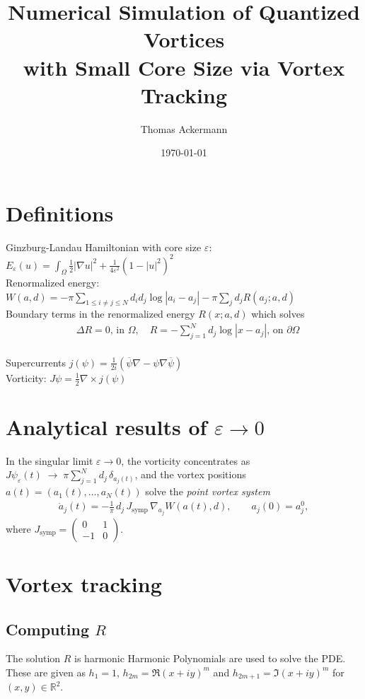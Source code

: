 \documentclass[12pt, a4paper]{article}
\title{
  \textbf{Numerical Simulation of Quantized Vortices\\
  with Small Core Size via Vortex Tracking}\\
}
\author{Thomas Ackermann}
\date{\today}
\theoremstyle{plain}
\theoremstyle{definition}
\newcommand{\psieps}{\psi_\varepsilon}
\newcommand{\symp}{J_{\mathrm{symp}}}
\begin{document}
\maketitle
\thispagestyle{empty}

\section{Definitions}

Ginzburg-Landau Hamiltonian with core size $\varepsilon$: $E_\varepsilon (u) = \int_\Omega \frac{1}{2} |\nabla u|^2 + \frac{1}{4 \varepsilon^2} (1- |u|^2)^2$ \\
Renormalized energy: $W(a,d) =  - \pi \sum_{1 \leq i \neq j \leq N} d_i d_j \log |a_i - a_j| - \pi \sum_j d_j R(a_j ; a, d)$ \\
Boundary terms in the renormalized energy $R(x; a,d)$ which solves
\begin{align}
  &\Delta R = 0 \text{, in } \Omega, \quad R = - \sum^N_{j=1} d_j \log |x-a_j| \text{, on } \partial \Omega
\end{align} \\
Supercurrents $j(\psi) = \frac{1}{2i}(\overline{\psi} \nabla - \psi \nabla \overline{\psi})$ \\
Vorticity: $J \psi = \frac{1}{2} \nabla \times j(\psi)$ \\

\section{Analytical results of $\varepsilon \to 0$}
In the singular limit $\varepsilon \to 0$, the vorticity concentrates as $J\psieps(t) \;\to\; \pi\sum_{j=1}^N d_j\,\delta_{a_j(t)}$,
and the vortex positions $a(t) = (a_1(t),\ldots,a_N(t))$ solve the
\emph{point vortex system}
  \begin{align}
    \dot{a}_j(t)
  = -\frac{1}{\pi}\,d_j\,\symp\,\nabla_{a_j} W(a(t), d),
  \qquad a_j(0) = a_j^0,
  \end{align}
where $\symp = \begin{pmatrix} 0 & 1 \\ -1 & 0 \end{pmatrix}$.

\section{Vortex tracking}

\subsection{Computing $R$}
The solution $R$ is harmonic 
Harmonic Polynomials are used to solve the PDE. These are given as $h_1 = 1$,
$h_{2m} = \Re (x+ i y)^m$
and $h_{2m + 1} =  \Im (x+ iy)^m$ for $(x,y) \in \mathbb R^2$.
\end{document}
